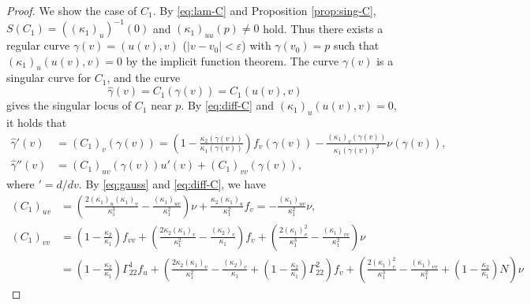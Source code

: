 \documentclass[11pt,a4paper,pdflatex,final]{amsart}
\theoremstyle{plain}
\theoremstyle{definition}
\theoremstyle{remark}
\newcommand{\0}{\bm{0}}
\newcommand{\eps}{\varepsilon}
\numberwithin{equation}{section}
\begin{document}
{\begin{proof}
	We show the case of $C_1$. 
	By \eqref{eq:lam-C} and 
	Proposition \ref{prop:sing-C}, $S(C_1)=((\kappa_1)_u)^{-1}(0)$ and $(\kappa_1)_{uu}(p)\neq0$ hold. 
	Thus there exists a regular curve $\gamma(v)=(u(v),v)$ ($|v-v_0|<\eps$) 
	with $\gamma(v_0)=p$ such that 
	$(\kappa_1)_u(u(v),v)=0$ by the implicit function theorem. 
	The curve $\gamma(v)$ is a singular curve for $C_1$, 
	and the curve 
	\begin{equation}\label{eq:hat-gamma}
		\hat{\gamma}(v)=C_1(\gamma(v))=C_1(u(v),v)
	\end{equation}
	gives the singular locus of $C_1$ near $p$. 
	By \eqref{eq:diff-C} and $(\kappa_1)_u(u(v),v)=0$, 
	it holds that 
	\begin{equation}\label{eq:d-gammas}
		\begin{aligned}
			\hat{\gamma}'(v)&=(C_1)_v(\gamma(v))
			=\left(1-\frac{\kappa_2(\gamma(v))}{\kappa_1(\gamma(v))}\right)f_v(\gamma(v))
			-\frac{(\kappa_1)_v(\gamma(v))}{\kappa_1(\gamma(v))^2}\nu(\gamma(v)),\\
			\hat{\gamma}''(v)&=
			(C_1)_{uv}(\gamma(v))u'(v)+(C_1)_{vv}(\gamma(v)),
		\end{aligned}
	\end{equation}	
	where $'=d/dv$. 
	By \eqref{eq:gauss} and \eqref{eq:diff-C}, we have 
	\begin{equation}\label{eq:dd-C}
		\begin{aligned}
			(C_1)_{uv}&=\left(\frac{2(\kappa_1)_u(\kappa_1)_v}{\kappa_1^3}
			-\frac{(\kappa_1)_{uv}}{\kappa_1^2}\right)\nu
			+\frac{\kappa_2(\kappa_1)_u}{\kappa_1^2}f_v
			=-\frac{(\kappa_1)_{uv}}{\kappa_1^2}\nu,\\
			(C_1)_{vv}&=\left(1-\frac{\kappa_2}{\kappa_1}\right)f_{vv}
			+\left(\frac{2\kappa_2(\kappa_1)_v}{\kappa_1^2}-\frac{(\kappa_2)_{v}}{\kappa_1}\right)f_v
			+\left(\frac{2(\kappa_1)_v^2}{\kappa_1^3}-\frac{(\kappa_1)_{vv}}{\kappa_1^2}\right)\nu\\
			&=\left(1-\frac{\kappa_2}{\kappa_1}\right)\Gamma^{1}_{22}f_u
			+\left(\frac{2\kappa_2(\kappa_1)_v}{\kappa_1^2}-\frac{(\kappa_2)_{v}}{\kappa_1}
			+\left(1-\frac{\kappa_2}{\kappa_1}\right)\Gamma^{2}_{22}\right)f_v
			+\left(\frac{2(\kappa_1)_v^2}{\kappa_1^3}-\frac{(\kappa_1)_{vv}}{\kappa_1^2}
			+\left(1-\frac{\kappa_2}{\kappa_1}\right)N\right)\nu
		\end{aligned}
	\end{equation}

\end{proof}}
\end{document}
